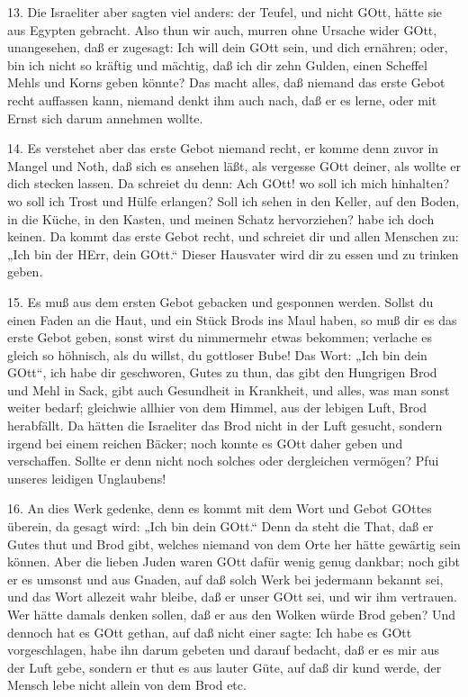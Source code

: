 13. Die Israeliter aber sagten viel anders: der Teufel, und nicht GOtt, hätte sie aus Egypten gebracht. Also thun wir auch, murren ohne Ursache wider GOtt, unangesehen, daß er zugesagt: Ich will dein GOtt sein, und dich ernähren; oder, bin ich nicht so kräftig und mächtig, daß ich dir zehn Gulden, einen Scheffel Mehls und Korns geben könnte? Das macht alles, daß niemand das erste Gebot recht auffassen kann, niemand denkt ihm auch nach, daß er es lerne, oder mit Ernst sich darum annehmen wollte.

14. Es verstehet aber das erste Gebot niemand recht, er komme denn zuvor in Mangel und Noth, daß sich es ansehen läßt, als vergesse GOtt deiner, als wollte er dich stecken lassen. Da schreiet du denn: Ach GOtt! wo soll ich mich hinhalten? wo soll ich Trost und Hülfe erlangen? Soll ich sehen in den Keller, auf den Boden, in die Küche, in den Kasten, und meinen Schatz hervorziehen? habe ich doch keinen. Da kommt das erste Gebot recht, und schreiet dir und allen Menschen zu: „Ich bin der HErr, dein GOtt.“ Dieser Hausvater wird dir zu essen und zu trinken geben.

15. Es muß aus dem ersten Gebot gebacken und gesponnen werden. Sollst du einen Faden an die Haut, und ein Stück Brods ins Maul haben, so muß dir es das erste Gebot geben, sonst wirst du nimmermehr etwas bekommen; verlache es gleich so höhnisch, als du willst, du gottloser Bube! Das Wort: „Ich bin dein GOtt“, ich habe dir geschworen, Gutes zu thun, das gibt den Hungrigen Brod und Mehl in Sack, gibt auch Gesundheit in Krankheit, und alles, was man sonst weiter bedarf; gleichwie allhier von dem Himmel, aus der lebigen Luft, Brod herabfällt. Da hätten die Israeliter das Brod nicht in der Luft gesucht, sondern irgend bei einem reichen Bäcker; noch konnte es GOtt daher geben und verschaffen. Sollte er denn nicht noch solches oder dergleichen vermögen? Pfui unseres leidigen Unglaubens!

16. An dies Werk gedenke, denn es kommt mit dem Wort und Gebot GOttes überein, da gesagt wird: „Ich bin dein GOtt.“ Denn da steht die That, daß er Gutes thut und Brod gibt, welches niemand von dem Orte her hätte gewärtig sein können. Aber die lieben Juden waren GOtt dafür wenig genug dankbar; noch gibt er es umsonst und aus Gnaden, auf daß solch Werk bei jedermann bekannt sei, und das Wort allezeit wahr bleibe, daß er unser GOtt sei, und wir ihm vertrauen. Wer hätte damals denken sollen, daß er aus den Wolken würde Brod geben? Und dennoch hat es GOtt gethan, auf daß nicht einer sagte: Ich habe es GOtt vorgeschlagen, habe ihn darum gebeten und darauf bedacht, daß er es mir aus der Luft gebe, sondern er thut es aus lauter Güte, auf daß dir kund werde, der Mensch lebe nicht allein von dem Brod etc.

